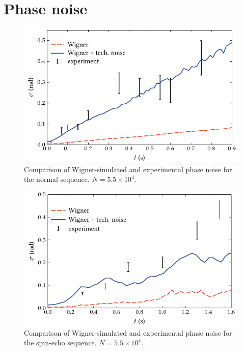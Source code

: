 \section{Phase noise}

\begin{figure}
    \centerline{\includegraphics{figures_generated/bec_noise/ramsey_noise.pdf}}

    \caption{
    Comparison of Wigner-simulated and experimental phase noise for the normal sequence.
    $N = 5.5 \times 10^4$.}

    \label{fig:bec-noise:phase-noise:ramsey-phnoise}
\end{figure}

\begin{figure}
    \centerline{\includegraphics{figures_generated/bec_noise/echo_noise.pdf}}

    \caption{
    Comparison of Wigner-simulated and experimental phase noise for the spin-echo sequence.
    $N = 5.5 \times 10^4$.}

    \label{fig:bec-noise:phase-noise:echo-phnoise}
\end{figure}

